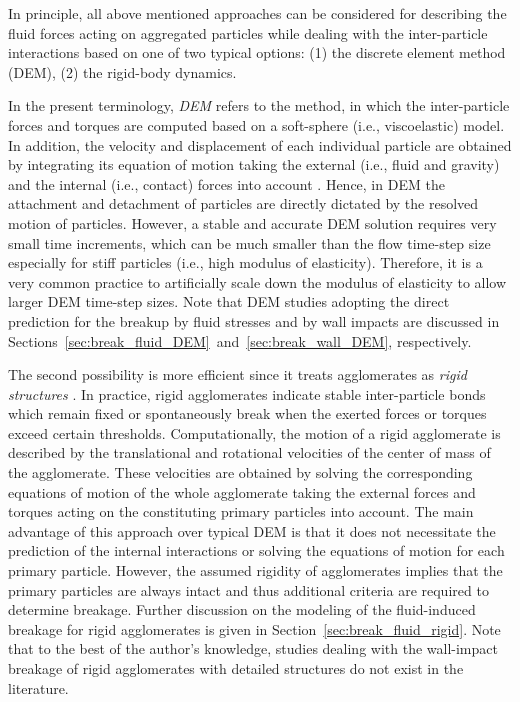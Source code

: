 In principle, all above mentioned approaches can be considered for
describing the fluid forces acting on aggregated particles while
dealing with the inter-particle interactions based on one of two
typical options: (1) the discrete element method (DEM), (2) the
rigid-body dynamics.

In the present terminology, \emph{DEM} refers to the method, in which
the inter-particle forces and torques are computed based on a
soft-sphere (i.e., viscoelastic) model. In addition, the velocity and
displacement of each individual particle are obtained by integrating
its equation of motion taking the external (i.e., fluid and gravity)
and the internal (i.e., contact) forces into account
\citep{cundall1979}. Hence, in DEM the attachment and detachment of
particles are directly dictated by the resolved motion of
particles. However, a stable and accurate DEM solution requires very
small time increments, which can be much smaller than the flow
time-step size especially for stiff particles (i.e., high modulus of
elasticity).  Therefore, it is a very common practice to artificially
scale down the modulus of elasticity to allow larger DEM time-step
sizes. Note that DEM studies adopting the direct prediction for the
breakup by fluid stresses and by wall impacts are discussed in
Sections~\ref{sec:break_fluid_DEM}~and~\ref{sec:break_wall_DEM},
respectively.

The second possibility is more efficient since it treats agglomerates
as \emph{rigid structures}
\citep[e.g.,][]{seto2011hydrodynamic,vanni2011hydrodynamic,fellay2012effect,schutte2015hydrodynamic,debona2014}.
In practice, rigid agglomerates indicate stable inter-particle bonds
which remain fixed or spontaneously break when the exerted forces or
torques exceed certain thresholds. Computationally, the motion of a
rigid agglomerate is described by the translational and rotational
velocities of the center of mass of the agglomerate. These velocities
are obtained by solving the corresponding equations of motion of the
whole agglomerate taking the external forces and torques acting on the
constituting primary particles into account. The main advantage of
this approach over typical DEM is that it does not necessitate the
prediction of the internal interactions or solving the equations of
motion for each primary particle.  However, the assumed rigidity of
agglomerates implies that the primary particles are always intact and
thus additional criteria are required to determine breakage. Further
discussion on the modeling of the fluid-induced breakage for rigid
agglomerates is given in Section~\ref{sec:break_fluid_rigid}. Note
that to the best of the author's knowledge, studies dealing with the
wall-impact breakage of rigid agglomerates with detailed structures do
not exist in the literature.

